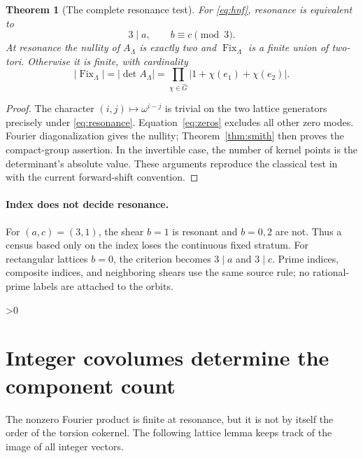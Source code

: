 \documentclass[10pt]{article}
\newcommand{\Fix}{\operatorname{Fix}}
\newtheorem{theorem}{Theorem}
\begin{document}
\begin{theorem}[The complete resonance test]\label{thm:resonance}
For \eqref{eq:hnf}, resonance is equivalent to
\begin{equation}\label{eq:resonance}
 3\mid a,\qquad b\equiv c\pmod3.
\end{equation}
At resonance the nullity of $A_\Lambda$ is exactly two and $\Fix_\Lambda$
is a finite union of two-tori. Otherwise it is finite, with cardinality
\begin{equation}\label{eq:nonsingular}
 |\Fix_\Lambda|=|\det A_\Lambda|
 =\prod_{\chi\in\widehat G}|1+\chi(e_1)+\chi(e_2)|.
\end{equation}
\end{theorem}
\begin{proof}
The character $(i,j)\mapsto\omega^{i-j}$ is trivial on the two lattice
generators precisely under \eqref{eq:resonance}. Equation~\eqref{eq:zeros}
excludes all other zero modes. Fourier diagonalization gives the nullity;
Theorem~\ref{thm:smith} then proves the compact-group assertion. In the
invertible case, the number of kernel points is the determinant's absolute
value. These arguments reproduce the classical test in \cite[Example 3.2]{lsv}
with the current forward-shift convention.
\end{proof}

\paragraph{Index does not decide resonance.}
For $(a,c)=(3,1)$, the shear $b=1$ is resonant and $b=0,2$ are not.
Thus a census based only on the index loses the continuous fixed stratum.
For rectangular lattices $b=0$, the criterion becomes $3\mid a$ and
$3\mid c$. Prime indices, composite indices, and neighboring shears use
the same source rule; no rational-prime labels are attached to the orbits.

\ifnum\CRevisionRound>0
\section{Integer covolumes determine the component count}\label{sec:covolume}
The nonzero Fourier product is finite at resonance, but it is not by
itself the order of the torsion cokernel. The following lattice lemma
keeps track of the image of all integer vectors.
\end{document}
